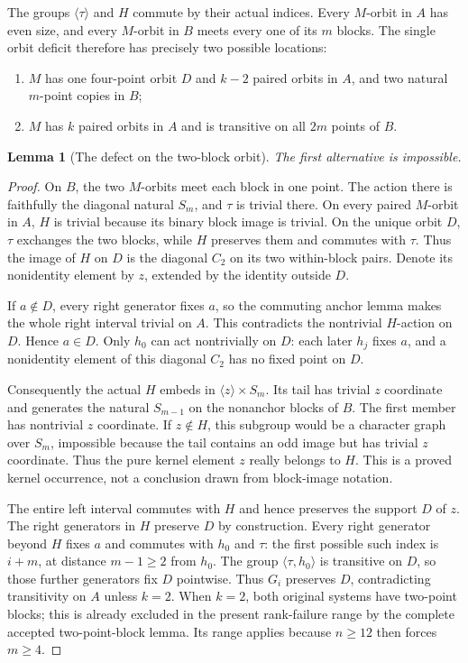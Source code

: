 \documentclass[11pt,a4paper]{article}
\newtheorem{lemma}{Lemma}
\newcommand{\gen}[1]{\langle#1\rangle}
\begin{document}
The groups $\gen\tau$ and $H$ commute by their actual indices.
Every $M$-orbit in $A$ has even size, and every $M$-orbit in
$B$ meets every one of its $m$ blocks. The single orbit deficit
therefore has precisely two possible locations:
\begin{enumerate}
\item $M$ has one four-point orbit $D$ and $k-2$ paired orbits
in $A$, and two natural $m$-point copies in $B$;
\item $M$ has $k$ paired orbits in $A$ and is transitive on all
$2m$ points of $B$.
\end{enumerate}

\begin{lemma}[The defect on the two-block orbit]
The first alternative is impossible.
\end{lemma}
\begin{proof}
On $B$, the two $M$-orbits meet each block in one point.
The action there is faithfully the diagonal natural $S_m$,
and $\tau$ is trivial there. On every paired $M$-orbit in $A$,
$H$ is trivial because its binary block image is trivial.
On the unique orbit $D$, $\tau$ exchanges the two blocks,
while $H$ preserves them and commutes with $\tau$. Thus the
image of $H$ on $D$ is the diagonal $C_2$ on its two
within-block pairs. Denote its nonidentity element by $z$,
extended by the identity outside $D$.

If $a\notin D$, every right generator fixes $a$, so the
commuting anchor lemma makes the whole right interval trivial
on $A$. This contradicts the nontrivial $H$-action on $D$.
Hence $a\in D$. Only $h_0$ can act nontrivially on $D$:
each later $h_j$ fixes $a$, and a nonidentity element of this
diagonal $C_2$ has no fixed point on $D$.

Consequently the actual $H$ embeds in $\gen z\times S_m$.
Its tail has trivial $z$ coordinate and generates the natural
$S_{m-1}$ on the nonanchor blocks of $B$. The first member
has nontrivial $z$ coordinate. If $z\notin H$, this subgroup
would be a character graph over $S_m$, impossible because the
tail contains an odd image but has trivial $z$ coordinate.
Thus the pure kernel element $z$ really belongs to $H$.
This is a proved kernel occurrence, not a conclusion drawn
from block-image notation.

The entire left interval commutes with $H$ and hence preserves
the support $D$ of $z$. The right generators in $H$ preserve
$D$ by construction. Every right generator beyond $H$ fixes
$a$ and commutes with $h_0$ and $\tau$: the first possible
such index is $i+m$, at distance $m-1\geq2$ from $h_0$.
The group $\gen{\tau,h_0}$ is transitive on $D$, so those
further generators fix $D$ pointwise. Thus $G_i$ preserves
$D$, contradicting transitivity on $A$ unless $k=2$.
When $k=2$, both original systems have two-point blocks;
this is already excluded in the present rank-failure range
by the complete accepted two-point-block lemma. Its range
applies because $n\geq12$ then forces $m\geq4$.
\end{proof}
\end{document}
